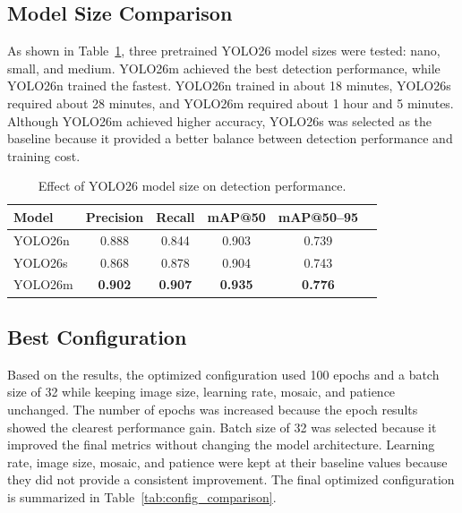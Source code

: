 \documentclass[10pt,twocolumn,letterpaper]{article}
\begin{document}
\subsection{Model Size Comparison}

As shown in Table~\ref{tab:model_size_result}, three pretrained YOLO26 model sizes were tested: nano, small, and medium. YOLO26m achieved the best detection performance, while YOLO26n trained the fastest. YOLO26n trained in about 18 minutes, YOLO26s required about 28 minutes, and YOLO26m required about 1 hour and 5 minutes. Although YOLO26m achieved higher accuracy, YOLO26s was selected as the baseline because it provided a better balance between detection performance and training cost.

\begin{table}[!htbp]
  \centering
  \small
  \begin{tabular}{@{}lccccc@{}}
    \toprule
    Model & Precision & Recall & mAP@50 & mAP@50--95 \\
    \midrule
    YOLO26n & 0.888 & 0.844 & 0.903 & 0.739 \\
    YOLO26s & 0.868 & 0.878 & 0.904 & 0.743 \\
    YOLO26m & \textbf{0.902} & \textbf{0.907} & \textbf{0.935} & \textbf{0.776} \\
    \bottomrule
  \end{tabular}
  \caption{Effect of YOLO26 model size on detection performance.}
  \label{tab:model_size_result}
\end{table}

\subsection{Best Configuration}

Based on the results, the optimized configuration used 100 epochs and a batch size of 32 while keeping image size, learning rate, mosaic, and patience unchanged. The number of epochs was increased because the epoch results showed the clearest performance gain. Batch size of 32 was selected because it improved the final metrics without changing the model architecture. Learning rate, image size, mosaic, and patience were kept at their baseline values because they did not provide a consistent improvement. The final optimized configuration is summarized in Table~\ref{tab:config_comparison}.
\end{document}
